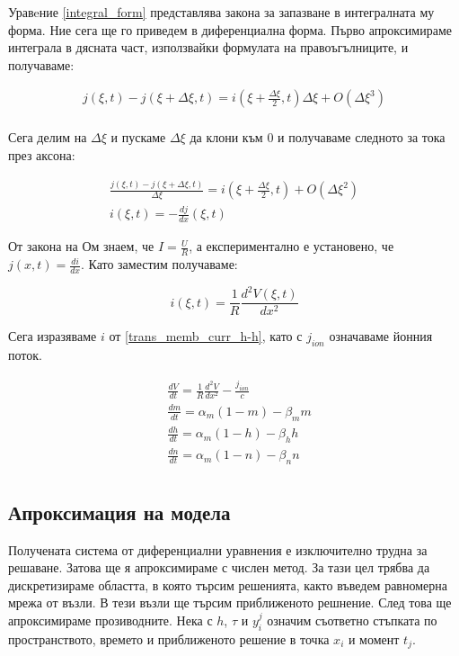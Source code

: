 \documentclass{article}
\numberwithin{equation}{section}
\begin{document}
Уравeние \eqref{integral_form} представлява закона за запазване в интегралната му форма. Ние сега ще го приведем в диференциална форма.
Първо апроксимираме интеграла в дясната част, използвайки формулата на правоъгълниците, и получаваме:

    \begin{gather*} 
        j\left(\xi,t\right) - j\left(\xi + \Delta\xi, t\right) = i\left(\xi + \frac{\Delta\xi}{2},t\right)\Delta\xi +
        O\left(\Delta\xi^3\right)\\
     \end{gather*}

    Сега делим на $\Delta\xi$ и пускаме $\Delta\xi$ да клони към 0 и получаваме следното за тока през аксона:
     
    \begin{gather*} 
        \frac{j\left(\xi,t\right) - j\left(\xi + \Delta\xi, t\right)}{\Delta\xi} = i\left(\xi + \frac{\Delta\xi}{2},t\right) +
        O\left(\Delta\xi^2\right)\\
        i\left(\xi,t\right) = -\frac{dj}{dx}\left(\xi,t\right)
     \end{gather*}

     От закона на Ом знаем, че $I = \frac{U}{R}$, а експериментално е установено, че $j(x,t) = \frac{di}{dx}$. Като заместим получаваме:

     \begin{equation}
         i(\xi,t) = \frac{1}{R}\frac{d^2V(\xi,t)}{dx^2}
     \end{equation}

     Сега изразяваме $i$ от \eqref{trans_memb_curr_h-h}, като с $j_{ion}$ означаваме йонния поток.

     \begin{equation}
        \begin{aligned}
            &\frac{dV}{dt} = \frac{1}{R}\frac{d^2V}{dx^2} - \frac{j_{ion}}{c}\\
            &\frac{dm}{dt} = \alpha_m(1-m) - \beta_mm\\
            &\frac{dh}{dt} = \alpha_m(1-h) - \beta_hh\\
            &\frac{dn}{dt} = \alpha_m(1-n) - \beta_nn\\
        \end{aligned}
     \end{equation}

    \subsection{Апроксимация на модела} 
    Получената система от диференциални уравнения е изключително трудна за решаване. Затова ще я апроксимираме с числен метод. За тази цел
    трябва да дискретизираме областта, в която търсим решенията, както въведем равномерна мрежа от възли. В тези възли ще търсим
    приближеното решнение. След това ще апроксимираме прозиводните. Нека с $h$, $\tau$ и $y_i^j$ означим съответно стъпката по
    пространството, времето и приближеното решение в точка $x_i$ и момент $t_j$. 
    
\end{document}

